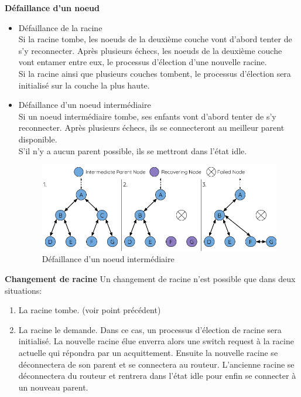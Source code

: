 \documentclass[a4paper, 12pt]{report}
\begin{document}
        \vspace{0.5cm}
        \textbf{Défaillance d'un noeud}\newline
            \begin{itemize}
                \item Défaillance de la racine\\
                    Si la racine tombe, les noeuds de la deuxième couche vont d'abord tenter de s'y reconnecter.
                    Après plusieurs échecs, les noeuds de la deuxième couche vont entamer entre eux, le processus d'élection d'une nouvelle racine.\\
                    Si la racine ainsi que plusieurs couches tombent, le processus d'élection sera initialisé sur la couche la plus haute.


                \item Défaillance d'un noeud intermédiaire\\
                    Si un noeud intermédiaire tombe, ses enfants vont d'abord tenter de s'y reconnecter.
                    Après plusieurs échecs, ils se connecteront au meilleur parent disponible.\\
                    S'il n'y a aucun parent possible, ils se mettront dans l'état idle.
                    \begin{figure}[H]
                        \centering
                        \includegraphics[scale=0.5]{images/mesh-parent-node-failure.png}
                        \caption{Défaillance d'un noeud intermédiaire\cite{esp-mesh_w}}
                    \end{figure}
            \end{itemize}
            \vspace{0.5cm}
            \textbf{Changement de racine}\newline
                Un changement de racine n'est possible que dans deux situations:
                \begin{enumerate}
                    \item La racine tombe. (voir point précédent)
                    \item La racine le demande.
                        Dans ce cas, un processus d'élection de racine sera initialisé. La nouvelle racine élue
                        enverra alors une switch request à la racine actuelle qui répondra par un acquittement.
                        Ensuite la nouvelle racine se déconnectera de son parent et se connectera au routeur.
                        L'ancienne racine se déconnectera du routeur et rentrera dans l'état idle pour enfin se connecter à un nouveau parent.
                \end{enumerate}
\end{document}
